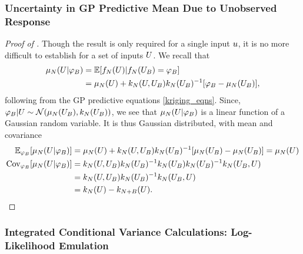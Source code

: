 \documentclass[12pt]{article}
\begin{document}
\subsubsection{Uncertainty in GP Predictive Mean Due to Unobserved Response}

\begin{proof} [Proof of ]
Though the result is only required for a single input $\Par$, it is no more difficult to establish for a set of inputs $\parMat$. 
We recall that 
\begin{align*}
\gpMean[\Ndesign](\parMat | \designBatchFunc) 
&= \E[\funcEm[\Ndesign](\parMat) | \funcEm(\designBatchIn) = \designBatchFunc] \\
&= \gpMean[\Ndesign](\parMat) + \gpKer[\Ndesign](\parMat, \designBatchIn) \gpKer[\Ndesign](\designBatchIn)^{-1} [\designBatchFunc - \gpMean[\Ndesign](\designBatchIn)],
\end{align*}
following from the GP predictive equations \ref{kriging_eqns}. Since, $\designBatchFunc|\parMat \sim \Gaussian(\gpMean[\Ndesign](\designBatchIn), \gpKer[\Ndesign](\designBatchIn))$, 
we see that $\gpMean[\Ndesign](\parMat | \designBatchFunc)$ is a linear function of a Gaussian random variable. It is thus Gaussian distributed, with mean and covariance
\begin{align*}
\E_{\designBatchFunc}[\gpMean[\Ndesign](\parMat | \designBatchFunc)]
&= \gpMean[\Ndesign](\parMat) + \gpKer[\Ndesign](\parMat, \designBatchIn) \gpKer[\Ndesign](\designBatchIn)^{-1} [\gpMean[\Ndesign](\designBatchIn) - \gpMean[\Ndesign](\designBatchIn)] = \gpMean[\Ndesign](\parMat) \\
\Cov_{\designBatchFunc}[\gpMean[\Ndesign](\parMat | \designBatchFunc)]
&= \gpKer[\Ndesign](\parMat, \designBatchIn) \gpKer[\Ndesign](\designBatchIn)^{-1}  \gpKer[\Ndesign](\designBatchIn) \gpKer[\Ndesign](\designBatchIn)^{-1} \gpKer[\Ndesign](\designBatchIn, \parMat) \\
&=  \gpKer[\Ndesign](\parMat, \designBatchIn) \gpKer[\Ndesign](\designBatchIn)^{-1} \gpKer[\Ndesign](\designBatchIn, \parMat) \\
&= \gpKer[\Ndesign](\parMat) - \gpKer[\Naugment](\parMat).
\end{align*}
\end{proof}

\subsubsection{Integrated Conditional Variance Calculations: Log-Likelihood Emulation}
\end{document}

